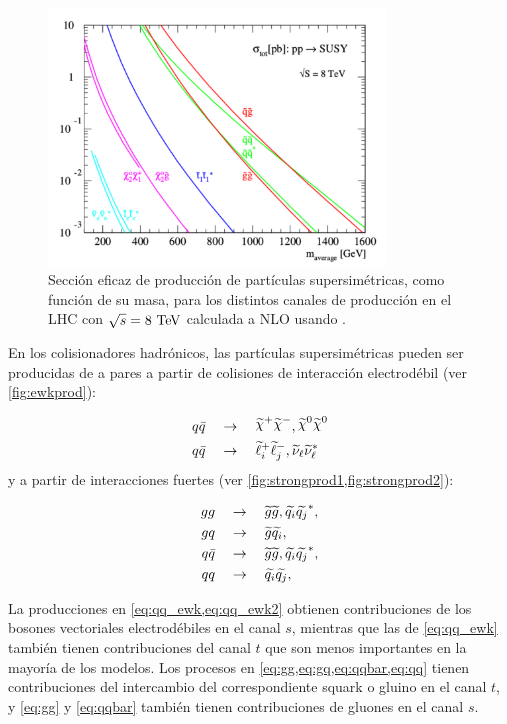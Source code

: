\begin{figure}[!htbp]
  \centering
  \includegraphics[width=0.8\textwidth]{figures/susy_lhc_xs_8tev}
  \caption{Sección eficaz de producción de partículas supersimétricas, como
    función de su masa, para los distintos canales de producción en el LHC con
    $\sqrt{s} = 8 \tev$ calculada a NLO usando \prospino.}
  \label{fig:xs_lhc_8tev}
\end{figure}


En los colisionadores hadrónicos, las partículas supersimétricas pueden ser
producidas de a pares a partir de colisiones de interacción
electrodébil (ver \cref{fig:ewkprod}):

\begin{align}
  &q\bar{q} \quad \to \quad \chinop \chinom, \nino \nino \label{eq:qq_ewk} \\
  &q\bar{q} \quad \to \quad \susy{\ell}^{+}_{i}\susy{\ell}^{-}_{j}, \susy{\nu}_{\ell}\susy{\nu}^{*}_{\ell} \label{eq:qq_ewk2}
\end{align}
%
y a partir de interacciones fuertes (ver \cref{fig:strongprod1,fig:strongprod2}):

\begin{align}
  gg \quad &\rightarrow \quad \widetilde{g}\widetilde{g}, \widetilde{q_i}\widetilde{q_j}^{*}, \label{eq:gg} \\
  gq \quad &\rightarrow \quad \widetilde{g}\widetilde{q_i}, \label{eq:gq} \\
  q\bar{q} \quad &\rightarrow \quad \widetilde{g}\widetilde{g}, \widetilde{q_i}\widetilde{q_j}^{*}, \label{eq:qqbar} \\
  qq \quad &\rightarrow \quad \widetilde{q_i}\widetilde{q_j}, \label{eq:qq}
\end{align}

La producciones en \cref{eq:qq_ewk,eq:qq_ewk2} obtienen contribuciones de los
bosones vectoriales electrodébiles en el canal $s$, mientras que las de
\cref{eq:qq_ewk} también tienen contribuciones del canal $t$ que son menos
importantes en la mayoría de los modelos. Los procesos en
\cref{eq:gg,eq:gq,eq:qqbar,eq:qq} tienen contribuciones del intercambio del
correspondiente squark o gluino en el canal $t$, y \cref{eq:gg} y
\cref{eq:qqbar} también tienen contribuciones de gluones en el canal $s$.

